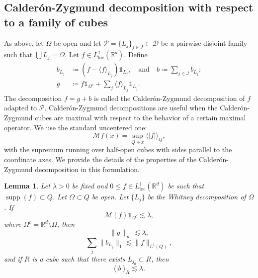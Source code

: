 \documentclass[12pt]{amsart}
\newcommand{\R}{\mathbb{R}}
\newcommand{\supp}[1]{\operatorname{supp}\left(#1\right) }
\newcommand{\one}{\mathds{1}}
\newcommand{\D}{\mathscr{D}}
\theoremstyle{plain}
\newtheorem{lemma}[theorem]{Lemma}
\theoremstyle{definition} %
\numberwithin{equation}{section}
\begin{document}
\subsection{Calder\'on-Zygmund decomposition with respect to a family of cubes} As above, let $\Omega$ be open and let $\mathcal{P}=\{L_j\}_{j\in J} \subset \D$ be a pairwise disjoint family such that $\bigcup L_j=\Omega$. Let $f\in L_{\mathrm{loc}}^{1}(\R^d)$. Define
\begin{align*}
    b_{L_j}
    &\coloneqq
    (f-\langle f\rangle_{L_j})\one_{L_j}, \quad \mbox{and} \quad b \coloneqq \sum_{j\in J}b_{L_j};
    \\
    g &\coloneqq
    f\one_{\Omega^c}+\sum_{j}\langle f\rangle_{L_j}\one_{L_j}.
    \end{align*}
The decomposition $f=g+b$ is called the Calder\'on-Zygmund decomposition of $f$ adapted to $\mathcal{P}$. Calder\'on-Zygmund decompositions are useful when the Calder\'on-Zygmund cubes are maximal with respect to the behavior of a certain maximal operator. We use the standard uncentered one:
$$
\mathcal{M}f(x) = \sup_{Q \ni x} \langle |f| \rangle_Q,
$$
with the supremum running over half-open cubes with sides parallel to the coordinate axes. We provide the details of the properties of the Calder\'on-Zygmund decomposition in this formulation.

\begin{lemma}\label{CZdecompProperties}
Let $\lambda>0$ be fixed and $0\leq f\in L_{\mathrm{loc}}^{1}(\R^d)$ be such that $\supp{f}\subset Q$. Let $\Omega \subset Q$ be open. Let $\{L_j\}$ be the Whitney decomposition of $\Omega$. If
    \begin{equation}\label{propiedadMaximalEnElAbierto}
        \mathcal{M}(f)\one_{\Omega^{c}}\lesssim \lambda,
    \end{equation}
where $\Omega^{c}=\R^d\setminus{\Omega}$, then    
\begin{equation}\label{inftyNormGoodPart}
        \|g\|_{\infty}\lesssim \lambda,%
    \end{equation}
    \begin{equation}\label{L1NormBadPart}
        \sum_j \|b_{L_j}\|_{1}\lesssim \|f\|_{L^1(Q)},
    \end{equation}
    and if $R$ is a cube such that there exists $L_{j_0}\subset R$, then
    \begin{equation}\label{1.2_Jose}
        \langle |b|\rangle_{R}\lesssim\lambda.
    \end{equation}
\end{lemma}
\end{document}
